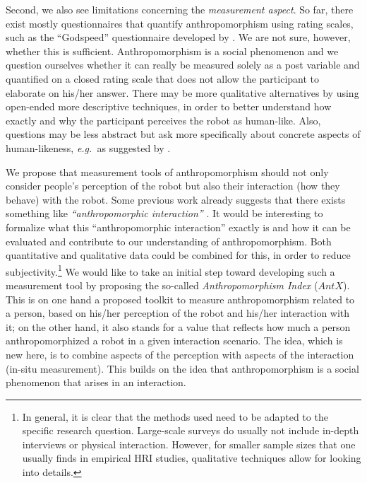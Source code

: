 \documentclass{frontiersSCNS} %
\newcommand{\eg}{{\textit{e.g.~}}}
\begin{document}
Second, we also see limitations concerning the \textit{measurement aspect}. So far, there exist mostly questionnaires that quantify anthropomorphism using rating scales, such as the ``Godspeed'' questionnaire developed by \cite{bartneck_measurement_2008}. We are not sure, however, whether this is sufficient. Anthropomorphism is a social phenomenon and we question ourselves whether it can really be measured solely as a post variable and quantified on a closed rating scale that does not allow the participant to elaborate on his/her answer. There may be more qualitative alternatives by using open-ended more descriptive techniques, in order to better understand how exactly and why the participant perceives the robot as human-like. Also, questions may be less abstract but ask more specifically about concrete aspects of human-likeness, \eg as suggested by \cite{kahn_jr._robotic_2006,ruijten_introducing_2014}.

We propose that measurement tools of anthropomorphism should not only consider people's perception of the robot but also their interaction (how they behave) with the robot. Some previous work already suggests that there exists something like \textit{``anthropomorphic interaction''} \citep{krach_can_2008,hegel_understanding_2008,weiss_i_2009}. It would be interesting to formalize what this ``anthropomorphic interaction'' exactly is and how it can be evaluated and contribute to our understanding of anthropomorphism. Both quantitative and qualitative data could be combined for this, in order to reduce subjectivity.\footnote{In general, it is clear that the methods used need to be adapted to the specific research question. Large-scale surveys do usually not include in-depth interviews or physical interaction. However, for smaller sample sizes that one usually finds in empirical HRI studies, qualitative techniques allow for looking into details.}
We would like to take an initial step toward developing such a measurement tool by proposing the so-called \textit{Anthropomorphism Index} ($AntX$). This is on one hand a proposed toolkit to measure anthropomorphism related to a person, based on his/her perception of the robot and his/her interaction with it; on the other hand, it also stands for a value that reflects how much a person anthropomorphized a robot in a given interaction scenario. The idea, which is new here, is to combine aspects of the perception with aspects of the interaction (in-situ measurement). This builds on the idea that anthropomorphism is a social phenomenon that arises in an interaction.
\end{document}
